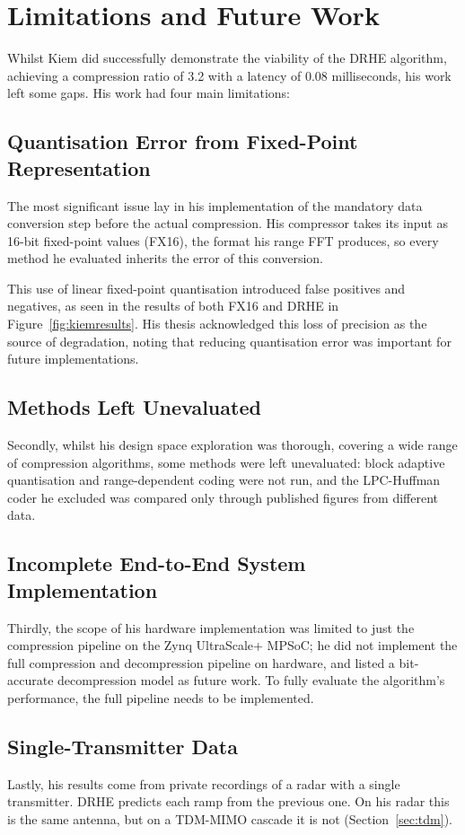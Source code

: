 \section{Limitations and Future Work}
\label{sec:kc_open}
Whilst Kiem did successfully demonstrate the viability of the DRHE algorithm, achieving a compression ratio of 3.2 with a latency of 0.08 milliseconds, his work left some gaps. His work had four main limitations:

\subsection{Quantisation Error from Fixed-Point Representation}
The most significant issue lay in his implementation of the mandatory data conversion step before the actual compression. His compressor takes its input as 16-bit fixed-point values (FX16), the format his range FFT produces, so every method he evaluated inherits the error of this conversion.

This use of linear fixed-point quantisation introduced false positives and negatives, as seen in the results of both FX16 and DRHE in Figure~\ref{fig:kiemresults}. His thesis acknowledged this loss of precision as the source of degradation, noting that reducing quantisation error was important for future implementations.

\subsection{Methods Left Unevaluated}
Secondly, whilst his design space exploration was thorough, covering a wide range of compression algorithms, some methods were left unevaluated: block adaptive quantisation and range-dependent coding were not run, and the LPC-Huffman coder he excluded was compared only through published figures from different data.

\subsection{Incomplete End-to-End System Implementation}
Thirdly, the scope of his hardware implementation was limited to just the compression pipeline on the Zynq UltraScale+ MPSoC; he did not implement the full compression and decompression pipeline on hardware, and listed a bit-accurate decompression model as future work. To fully evaluate the algorithm's performance, the full pipeline needs to be implemented.

\subsection{Single-Transmitter Data}
Lastly, his results come from private recordings of a radar with a single
transmitter. DRHE predicts each ramp from the previous one. On his radar this
is the same antenna, but on a TDM-MIMO cascade it is not
(Section~\ref{sec:tdm}).

